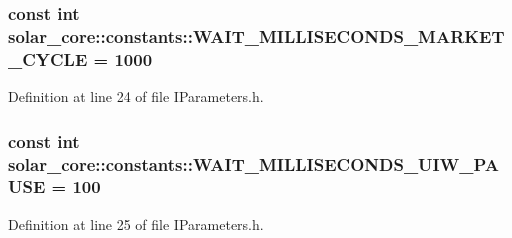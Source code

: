 \subsubsection[{W\+A\+I\+T\+\_\+\+M\+I\+L\+L\+I\+S\+E\+C\+O\+N\+D\+S\+\_\+\+M\+A\+R\+K\+E\+T\+\_\+\+C\+Y\+C\+L\+E}]{\setlength{\rightskip}{0pt plus 5cm}const int solar\+\_\+core\+::constants\+::\+W\+A\+I\+T\+\_\+\+M\+I\+L\+L\+I\+S\+E\+C\+O\+N\+D\+S\+\_\+\+M\+A\+R\+K\+E\+T\+\_\+\+C\+Y\+C\+L\+E = 1000}\label{namespacesolar__core_1_1constants_ab3dddf011f92328166c5f93e3951107e}


Definition at line 24 of file I\+Parameters.\+h.

\hypertarget{namespacesolar__core_1_1constants_abebba44aef8bbf544a330b8b20229320}{}
\subsubsection[{W\+A\+I\+T\+\_\+\+M\+I\+L\+L\+I\+S\+E\+C\+O\+N\+D\+S\+\_\+\+U\+I\+W\+\_\+\+P\+A\+U\+S\+E}]{\setlength{\rightskip}{0pt plus 5cm}const int solar\+\_\+core\+::constants\+::\+W\+A\+I\+T\+\_\+\+M\+I\+L\+L\+I\+S\+E\+C\+O\+N\+D\+S\+\_\+\+U\+I\+W\+\_\+\+P\+A\+U\+S\+E = 100}\label{namespacesolar__core_1_1constants_abebba44aef8bbf544a330b8b20229320}


Definition at line 25 of file I\+Parameters.\+h.

